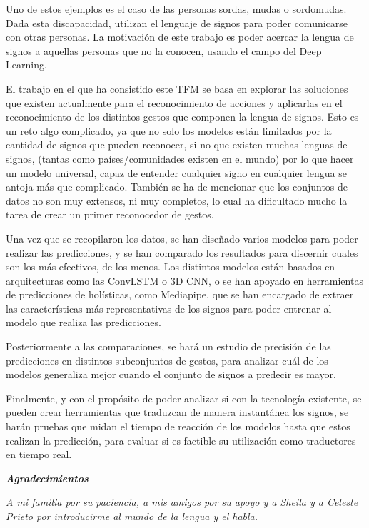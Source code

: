 \documentclass{article} %
\begin{document}
\noindent Uno de estos ejemplos es el caso de las personas sordas, mudas o sordomudas. Dada esta discapacidad, utilizan el lenguaje de signos para poder comunicarse con otras personas. La motivaci\'{o}n de este trabajo es poder acercar la lengua de signos a aquellas personas que no la conocen, usando el campo del Deep Learning. 

\noindent El trabajo en el que ha consistido este TFM se basa en explorar las soluciones que existen actualmente para el reconocimiento de acciones y aplicarlas en el reconocimiento de los distintos gestos que componen la lengua de signos. Esto es un reto algo complicado, ya que no solo los modelos est\'{a}n limitados por la cantidad de signos que pueden reconocer, si no que existen muchas lenguas de signos, (tantas como pa\'{i}ses/comunidades existen en el mundo) por lo que hacer un modelo universal, capaz de entender cualquier signo en cualquier lengua se antoja m\'{a}s que complicado. Tambi\'{e}n se ha de mencionar que los conjuntos de datos no son muy extensos, ni muy completos, lo cual ha dificultado mucho la tarea de crear un primer reconocedor de gestos.

\noindent Una vez que se recopilaron los datos, se han dise\~{n}ado varios modelos para poder realizar las predicciones, y se han comparado los resultados para discernir cuales son los m\'{a}s efectivos, de los menos. Los distintos modelos est\'{a}n basados en arquitecturas como las ConvLSTM o 3D CNN, o se han apoyado en herramientas de predicciones de hol\'{i}sticas, como Mediapipe, que se han encargado de extraer las caracter\'{i}sticas m\'{a}s representativas de los signos para poder entrenar al modelo que realiza las predicciones. 

\noindent Posteriormente a las comparaciones, se har\'{a} un estudio de precisi\'{o}n de las predicciones en distintos subconjuntos de gestos, para analizar cu\'{a}l de los modelos generaliza mejor cuando el conjunto de signos a predecir es mayor.

\noindent Finalmente, y con el prop\'{o}sito de poder analizar si con la tecnolog\'{i}a existente, se pueden crear herramientas que traduzcan de manera instant\'{a}nea los signos, se har\'{a}n pruebas que midan el tiempo de reacci\'{o}n de los modelos hasta que estos realizan la predicci\'{o}n, para evaluar si es factible su utilizaci\'{o}n como traductores en tiempo real. 

\noindent \textbf{\eject \eject  \textit{Agradecimientos}}

\noindent \textit{A mi familia por su paciencia, a mis amigos por su apoyo y a Sheila y a Celeste Prieto por introducirme al mundo de la lengua y el habla.}
\end{document}
